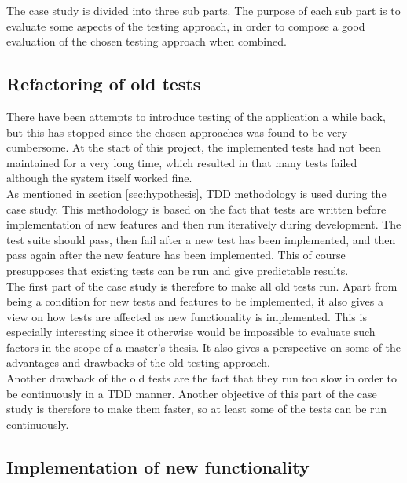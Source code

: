 
The case study is divided into three sub parts. The purpose of each
sub part is to evaluate some aspects of the testing approach, in order
to compose a good evaluation of the chosen testing approach when
combined.\\


\subsection{Refactoring of old tests}
\label{sec:casestudy_1}

There have been attempts to introduce testing of the application a while
back, but this has stopped since the chosen approaches was found to be
very cumbersome. At the start of this project, the implemented tests had
not been maintained for a very long time, which resulted in that many
tests failed although the system itself worked fine.\\

As mentioned in section \ref{sec:hypothesis}, TDD methodology is
used during the case study. This methodology is based on the fact that
tests are written before implementation of new features and then run
iteratively during development. The test suite should pass, then fail
after a new test has been implemented, and then pass again after the new
feature has been implemented. This of course presupposes that existing
tests can be run and give predictable results.\\

The first part of the case study is therefore to make all old tests run.
Apart from being a condition for new tests and features to be
implemented, it also gives a view on how tests are affected as new
functionality is implemented. This is especially interesting since it
otherwise would be impossible to evaluate such factors in the scope of a
master's thesis. It also gives a perspective on some of the advantages
and drawbacks of the old testing approach.\\

Another drawback of the old tests are the fact that they run too slow in
order to be continuously in a TDD manner. Another objective of this part
of the case study is therefore to make them faster, so at least some of
the tests can be run continuously.\\


\subsection{Implementation of new functionality}
\label{sec:casestudy_2}

